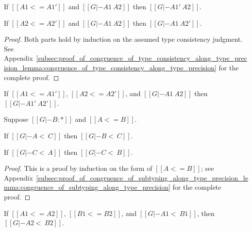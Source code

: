 \begin{lemma}
  \label{lemma:congruence_of_type_consistency_along_type_precision}
  \begin{enumR}
  \item[] 
  \item If $[[A1 <= A1']]$ and $[[G |- A1 ~ A2]]$ then
    $[[G |- A1' ~ A2]]$.
    
  \item If $[[A2 <= A2']]$ and $[[G |- A1 ~ A2]]$ then
    $[[G |- A1 ~ A2']]$.  
  \end{enumR}
\end{lemma}
\begin{proof}
  Both parts hold by induction on the assumed type consistency
  judgment.  See
  Appendix~\ref{subsec:proof_of_congruence_of_type_consistency_along_type_precision_lemma:congruence_of_type_consistency_along_type_precision}
  for the complete proof.
\end{proof}

\begin{corollary}
  \label{corollary:congruence_of_type_consistency_along_type_precision}
  If $[[A1 <= A1']]$, $[[A2 <= A2']]$, and $[[G |- A1 ~ A2]]$ then
  $[[G |- A1' ~ A2']]$.  
\end{corollary}

\begin{lemma}
  \label{lemma:congruence_of_subtyping_along_type_precision}
  Suppose $[[G |- B : *]]$ and $[[A <= B]]$.
  \begin{enumR}
  \item If $[[G |- A <~ C]]$ then $[[G |- B <~ C]]$.

  \item If $[[G |- C <~ A]]$ then $[[G |- C <~ B]]$.  
  \end{enumR}
\end{lemma}
\begin{proof}
  This is a proof by induction on the form of $[[A <= B]]$; see
  Appendix~\ref{subsec:proof_of_congruence_of_subtyping_along_type_precision_lemma:congruence_of_subtyping_along_type_precision}
  for the complete proof.
\end{proof}

\begin{corollary}
  \label{corollary:congruence_of_subtyping_along_type_precision}
  If $[[A1 <= A2]]$, $[[B1 <= B2]]$, and $[[G |- A1 <~ B1]]$, then $[[G |- A2 <~ B2]]$.
\end{corollary}

